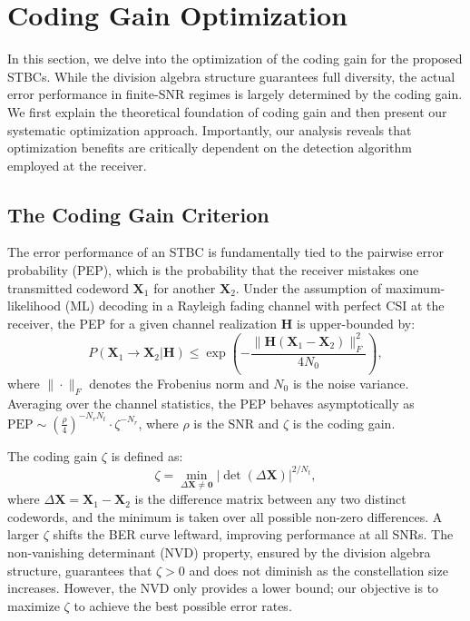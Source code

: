 \section{Coding Gain Optimization}
In this section, we delve into the optimization of the coding gain for the proposed STBCs. 
While the division algebra structure guarantees full diversity, the actual error performance in finite-SNR regimes is largely determined by the coding gain. 
We first explain the theoretical foundation of coding gain and then present our systematic optimization approach. 
Importantly, our analysis reveals that optimization benefits are critically dependent on the detection algorithm employed at the receiver.

\subsection{The Coding Gain Criterion}
The error performance of an STBC is fundamentally tied to the pairwise error probability (PEP), which is the probability that the receiver mistakes one transmitted codeword $\mathbf{X}_1$ for another $\mathbf{X}_2$. 
Under the assumption of maximum-likelihood (ML) decoding in a Rayleigh fading channel with perfect CSI at the receiver, the PEP for a given channel realization $\mathbf{H}$ is upper-bounded by:
\begin{equation}
P(\mathbf{X}_1 \to \mathbf{X}_2 | \mathbf{H}) \leq \exp\left( -\frac{\|\mathbf{H}(\mathbf{X}_1 - \mathbf{X}_2)\|_F^2}{4N_0} \right),
\end{equation}
where $\|\cdot\|_F$ denotes the Frobenius norm and $N_0$ is the noise variance. Averaging over the channel statistics, the PEP behaves asymptotically as $\text{PEP} \sim \left( \frac{\rho}{4} \right)^{-N_r N_t} \cdot \zeta^{-N_r}$, where $\rho$ is the SNR and $\zeta$ is the coding gain.

The coding gain $\zeta$ is defined as:
\begin{equation}
\zeta = \min_{\Delta\mathbf{X} \neq \mathbf{0}} |\det(\Delta\mathbf{X})|^{2/N_t},
\end{equation}
where $\Delta\mathbf{X} = \mathbf{X}_1 - \mathbf{X}_2$ is the difference matrix between any two distinct codewords, and the minimum is taken over all possible non-zero differences. A larger $\zeta$ shifts the BER curve leftward, improving performance at all SNRs. The non-vanishing determinant (NVD) property, ensured by the division algebra structure, guarantees that $\zeta > 0$ and does not diminish as the constellation size increases. However, the NVD only provides a lower bound; our objective is to maximize $\zeta$ to achieve the best possible error rates.

